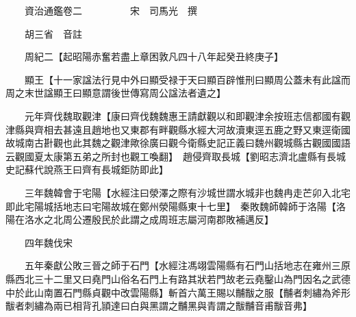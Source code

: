 










 


 
 


 

  
  
  
  
  





  
  
  
  
  
 
  

  

  
  
  



  

 
 

  
   




  

  
  


  　　資治通鑑卷二　　　　　宋　司馬光　撰

　　胡三省　音註

　　周紀二【起昭陽赤奮若盡上章困敦凡四十八年起癸丑終庚子】

　　顯王【十一家諡法行見中外曰顯受禄于天曰顯百辟惟刑曰顯周公蓋未有此諡而周之末世諡顯王曰顯意謂後世傳寫周公諡法者遺之】

　　元年齊伐魏取觀津【康曰齊伐魏魏惠王請獻觀以和即觀津余按班志信都國有觀津縣與齊相去甚遠且趙地也又東郡有畔觀縣水經大河故瀆東逕五鹿之野又東逕衛國故城南古卙觀也此其魏之觀津歟徐廣曰觀今衛縣史記正義曰魏州觀城縣古觀國國語云觀國夏太康第五弟之所封也觀工喚翻】　趙侵齊取長城【劉昭志濟北盧縣有長城史記蘇代說燕王曰齊有長城鉅防即此】

　　三年魏韓會于宅陽【水經注曰滎澤之際有沙城世謂水城非也魏冉走芒卯入北宅即此宅陽城括地志曰宅陽故城在鄭州滎陽縣東十七里】　秦敗魏師韓師于洛陽【洛陽在洛水之北周公遷殷民於此謂之成周班志屬河南郡敗補邁反】

　　四年魏伐宋

　　五年秦獻公敗三晉之師于石門【水經注馮翊雲陽縣有石門山括地志在雍州三原縣西北三十二里又曰堯門山俗名石門上有路其狀若門故老云堯鑿山為門因名之武德中於此山南置石門縣貞觀中改雲陽縣】斬首六萬王賜以黼黻之服【黼者刺繡為斧形黻者刺繡為兩已相背孔頴達曰白與黑謂之黼黑與青謂之黻黼音甫黻音弗】

